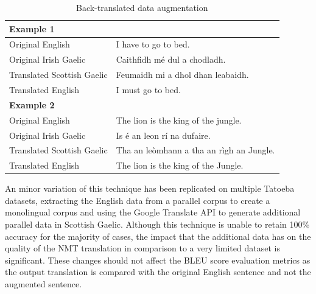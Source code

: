 \begin{table}[!ht]
\centering
\renewcommand{\arraystretch}{1.1}
\begin{tabular}{|l|l|}
\hline
\multicolumn{2}{|l|}{\textbf{Example 1}}                              \\ \hline
Original English           & I have to go to bed.                     \\ \hline
Original Irish Gaelic      & Caithfidh mé dul a chodladh.             \\ \hline
Translated Scottish Gaelic & Feumaidh mi a dhol dhan leabaidh.        \\ \hline
Translated English         & I must go to bed.                        \\ \hline
\multicolumn{2}{|l|}{\textbf{Example 2}}                              \\ \hline
Original English           & The lion is the king of the jungle.      \\ \hline
Original Irish Gaelic      & Is é an leon rí na dufaire.              \\ \hline
Translated Scottish Gaelic & Tha an leòmhann a tha an rìgh an Jungle. \\ \hline
Translated English         & The lion is the king of the Jungle.      \\ \hline
\end{tabular}
\captionsetup{justification=centering,font=Large}
\caption{Back-translated data augmentation}
\label{tab:back_translated-data}
\end{table}

An minor variation of this technique has been replicated on multiple Tatoeba datasets, extracting the English data from a parallel corpus to create a monolingual corpus and using the Google Translate API to generate additional parallel data in Scottish Gaelic. Although this technique is unable to retain 100\% accuracy for the majority of cases, the impact that the additional data has on the quality of the \acrshort{NMT} translation in comparison to a very limited dataset is significant. These changes should not affect the BLEU score evaluation metrics as the output translation is compared with the original English sentence and not the augmented sentence.



